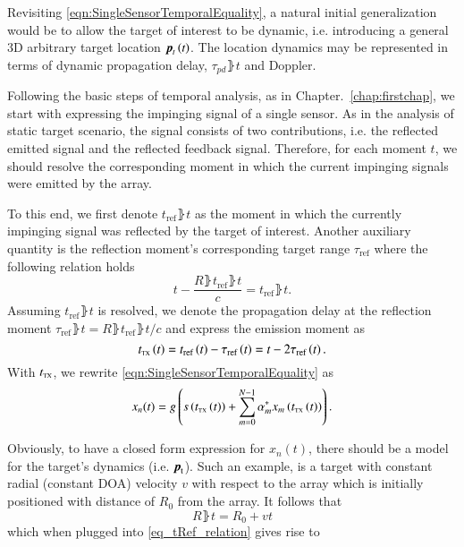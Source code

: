 Revisiting \eqref{eqn:SingleSensorTemporalEquality}, a natural initial generalization would be to allow the target of interest to be dynamic, i.e. introducing a general 3D arbitrary target location $\boldsymbol{p}_{t}\left({t}\right)$.
The location dynamics may be represented in terms of dynamic propagation delay, $\tau_{pd}\rBrace{t}$ and Doppler.
\par
Following the basic steps of temporal analysis, as in Chapter.~\ref{chap:firstchap}, we start with expressing the impinging signal of a single sensor.
As in the analysis of static target scenario, the signal consists of two contributions, i.e. the reflected emitted signal and the reflected feedback signal.
Therefore, for each moment $t$, we should resolve the corresponding moment in which the current impinging signals were emitted by the array.
\par
To this end, we first denote $t_{\text{ref}}\rBrace{t}$ as the moment in which the currently impinging signal was reflected by the target of interest.
Another auxiliary quantity is the reflection moment's corresponding target range $\tau_{\text{ref}}$ where the following relation holds
\begin{equation}
\label{eq_tRef_relation}
    t-\frac{R\rBrace{t_{\text{ref}}\rBrace{t}}}{c} = t_{\text{ref}}\rBrace{t}.
\end{equation}
Assuming $t_{\text{ref}}\rBrace{t}$ is resolved, we denote the propagation delay at the reflection moment $\tau_{\text{ref}}\rBrace{t} = R\rBrace{t_{\text{ref}}\rBrace{t}}/c$ and express the emission moment as
\begin{equation}
\label{eq_tTX}
    t_{\text{\tiny{TX}}}\left({t}\right) 
    = 
    t_{\text{ref}}\left({t}\right) - \tau_{\text{ref}}\left({t}\right) 
    =
    t - 2\tau_{\text{ref}}\left({t}\right).
\end{equation}
With $t_{\text{\tiny{TX}}}$, we rewrite \eqref{eqn:SingleSensorTemporalEquality} as
\begin{equation}
    \label{eq_fut_dyn_temp}
    x_{n}(t) = g\left({s\left({t_{\text{\tiny{TX}}}\left({t}\right)}\right)
    +\sum_{m=0}^{N-1}{\alpha^{*}_{m}x_{m}\left({t_{\text{\tiny{TX}}}\left({t}\right)}\right)}}\right).
\end{equation}
\par
Obviously, to have a closed form expression for $x_{n}(t)$, there should be a model for the target's dynamics (i.e. $\boldsymbol{p}_{\text{t}}{}$).
Such an example, is a target with constant radial (constant DOA) velocity $v$ with respect to the array which is initially positioned with distance of $R_{0}$ from the array.
It follows that
\begin{equation}
    \label{eq_fut_constV_Rt}
    R\rBrace{t} = R_{0} + vt
\end{equation}
which when plugged into \eqref{eq_tRef_relation} gives rise to

